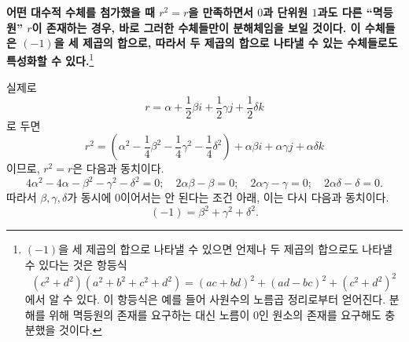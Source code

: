 \documentclass[11pt]{article}
\providecommand{\srcspaced}[1]{\textbf{#1}}
\begin{document}
\srcspaced{어떤 대수적 수체를 첨가했을 때 $r^2=r$을 만족하면서 $0$과 단위원 $1$과도 다른 ``멱등원'' $r$이 존재하는 경우, 바로 그러한 수체들만이 분해체임을 보일 것이다. 이 수체들은 $(-1)$을 세 제곱의 합으로, 따라서 두 제곱의 합으로 나타낼 수 있는 수체들로도 특성화할 수 있다.}\footnote{$(-1)$을 세 제곱의 합으로 나타낼 수 있으면 언제나 두 제곱의 합으로도 나타낼 수 있다는 것은 항등식
\[
(c^2+d^2)(a^2+b^2+c^2+d^2)=(ac+bd)^2+(ad-bc)^2+(c^2+d^2)^2
\]
에서 알 수 있다. 이 항등식은 예를 들어 사원수의 노름곱 정리로부터 얻어진다. 분해를 위해 멱등원의 존재를 요구하는 대신 노름이 $0$인 원소의 존재를 요구해도 충분했을 것이다.}

실제로
\[
        r=\alpha+\frac12\beta i+\frac12\gamma j+\frac12\delta k
\]
로 두면
\[
        r^2=\left(\alpha^2-\frac14\beta^2-\frac14\gamma^2-\frac14\delta^2\right)
          +\alpha\beta i+\alpha\gamma j+\alpha\delta k
\]
이므로, $r^2=r$은 다음과 동치이다.
\[
4\alpha^2-4\alpha-\beta^2-\gamma^2-\delta^2=0;\quad
2\alpha\beta-\beta=0;\quad 2\alpha\gamma-\gamma=0;\quad 2\alpha\delta-\delta=0.
\]
따라서 $\beta,\gamma,\delta$가 동시에 $0$이어서는 안 된다는 조건 아래, 이는 다시 다음과 동치이다.
\[
        (-1)=\beta^2+\gamma^2+\delta^2.
\]
\end{document}
